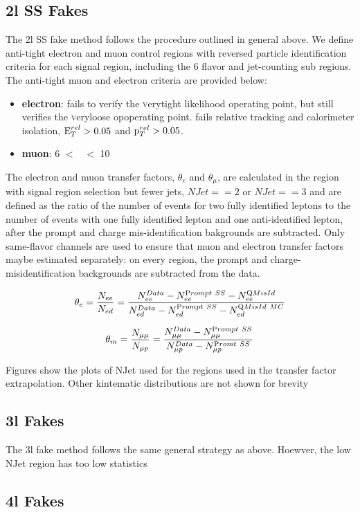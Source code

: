 \subsection{2l SS Fakes}
The 2l SS fake method follows the procedure outlined in general above. We define anti-tight electron and muon control regions with reversed particle identification criteria for each signal region, including the 6 flavor and jet-counting sub regions. The anti-tight muon and electron criteria are provided below:
  
\begin{itemize}

\item {\bf electron}: fails to verify the {\textsc verytight} likelihood operating point, but still verifies the {\textsc veryloose} opoperating point. fails relative tracking and calorimeter isolation, $\rm E_{T}^{rel}>0.05$ and $\rm p_{T}^{rel}>0.05$.

\item {\bf muon}: 6 \gevc $<$ \pt\ $<$ 10 \gevc

\end{itemize}

The electron and muon transfer factors, $\theta_e$ and $\theta_{\mu}$, are calculated in the region with signal region selection but fewer jets, $NJet == 2$ or $NJet ==3$ and are defined as the ratio of the number of events for two fully identified leptons to the number of events with one fully identified lepton and one anti-identified lepton, after the prompt and charge mis-identification bakgrounds are subtracted. Only same-flavor channels are used to ensure that muon and electron transfer factors maybe estimated separately:
on every region, the prompt and charge-misidentification backgrounds are subtracted from the data. 

 \begin{equation}
 \theta_{e} = \frac{N_{ee}}{N_{ed}}= \frac{  N^{Data}_{ee} - N^{\rm
 Prompt~SS}_{ee} - N^{\rm QMisId}_{ee} }{ N_{ed}^{Data} - N^{\rm
 Prompt~SS}_{ed} - N^{\rm QMisId~MC}_{ed} } 
\end{equation}
\label{equation:ss_def_thee}


 \begin{equation}
 \theta_{m} = \frac{N_{\mu\mu}}{N_{\mu p}}= \frac{ N_{\mu\mu}^{Data} - N^{\rm
 Prompt~SS}_{\mu\mu}}{ N_{\mu p}^{Data} - N^{\rm
 Promt~SS}_{\mu p} } 
\end{equation}
\label{equation:ss_def_thmm}

Figures show the plots of NJet used for the regions used in the transfer factor extrapolation. Other kintematic distributions
  are not shown for brevity











\subsection{3l Fakes}

The 3l fake method follows the same general strategy as above. Hoewver, the low NJet region has too low statistics


\subsection{4l Fakes}
